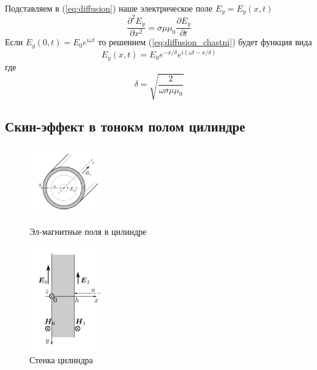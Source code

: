 \documentclass[a4paper, 12pt]{article}
\begin{document}
	Подставляем в (\ref{eq:diffusion}) наше электрическое поле $E_y=E_y(x,t)$
	\begin{equation}
		\frac{\partial^2 E_y}{\partial x^2} = \sigma\mu\mu_0\frac{\partial E_y}{\partial t}
		\label{eq:diffusion_chastni}
	\end{equation}
	Если $E_y(0,t)=E_0 e^{i\omega t}$ то решением (\ref{eq:diffusion_chastni}) будет функция вида
	\begin{equation}
		E_y(x,t)=E_0 e^{-x/\delta} e^{i(\omega t - x/\delta)}
		\label{eq:skin_effect_poluprostranstvo}
	\end{equation}
	где
	\begin{equation}
		\delta = \sqrt{\frac{2}{\omega\sigma\mu\mu_0}}
		\label{eq:delta}
	\end{equation}
	
	\newpage
	\subsection*{Скин-эффект в тонокм полом цилиндре}
	\vspace{1cm}
	\begin{figure}
		\begin{center}
			\includegraphics[width=0.28\textwidth]{image2}
		\end{center}
		\caption{Эл-магнитные поля в цилиндре}\label{fig:cilindr}
		
		\begin{center}
			\includegraphics[width=0.28\textwidth]{image3}
		\end{center}
		\caption{Стенка цилиндра}\label{fig:stenka}
	\end{figure}
	
\end{document}
